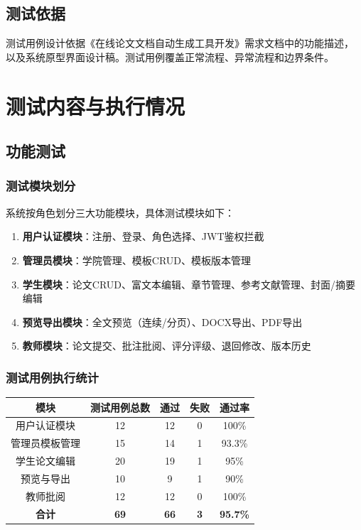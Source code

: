 \documentclass[a4paper,12pt]{article}
\begin{document}
\subsection{测试依据}
测试用例设计依据《在线论文文档自动生成工具开发》需求文档中的功能描述，
以及系统原型界面设计稿。测试用例覆盖正常流程、异常流程和边界条件。

\section{测试内容与执行情况}
\subsection{功能测试}
\subsubsection{测试模块划分}
系统按角色划分三大功能模块，具体测试模块如下：
\begin{enumerate}
  \item \textbf{用户认证模块}：注册、登录、角色选择、JWT鉴权拦截
  \item \textbf{管理员模块}：学院管理、模板CRUD、模板版本管理
  \item \textbf{学生模块}：论文CRUD、富文本编辑、章节管理、参考文献管理、封面/摘要编辑
  \item \textbf{预览导出模块}：全文预览（连续/分页）、DOCX导出、PDF导出
  \item \textbf{教师模块}：论文提交、批注批阅、评分评级、退回修改、版本历史
\end{enumerate}

\subsubsection{测试用例执行统计}
\begin{center}
\begin{tabular}{|c|c|c|c|c|}
\hline
模块 & 测试用例总数 & 通过 & 失败 & 通过率 \\
\hline
用户认证模块 & 12 & 12 & 0 & 100\% \\
管理员模板管理 & 15 & 14 & 1 & 93.3\% \\
学生论文编辑 & 20 & 19 & 1 & 95\% \\
预览与导出 & 10 & 9 & 1 & 90\% \\
教师批阅 & 12 & 12 & 0 & 100\% \\
\hline
\textbf{合计} & \textbf{69} & \textbf{66} & \textbf{3} & \textbf{95.7\%} \\
\hline
\end{tabular}
\end{center}
\end{document}
